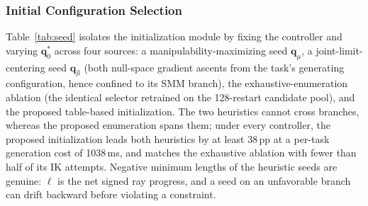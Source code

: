 \documentclass[journal]{IEEEtran}
\newcommand{\phSeedTime}{1038}      %
\newcommand{\phHeurGap}{38}        %
\begin{document}
\subsubsection{Initial Configuration Selection}
Table~\ref{tab:seed} isolates the initialization module by fixing the
controller and varying $\mathbf{q}^{*}_{0}$ across four sources: a
manipulability-maximizing seed $\mathbf{q}_{\mu}$, a
joint-limit-centering seed $\mathbf{q}_{\mathrm{jl}}$ (both null-space
gradient ascents from the task's generating configuration, hence
confined to its SMM branch), the exhaustive-enumeration ablation (the
identical selector retrained on the 128-restart candidate pool), and the
proposed table-based initialization. The two heuristics cannot cross
branches, whereas the proposed enumeration spans them; under every
controller, the proposed initialization leads both heuristics by at
least \phHeurGap\,pp at a per-task generation cost of
\phSeedTime\,ms, and matches the exhaustive ablation with fewer than
half of its IK attempts. Negative minimum lengths of the heuristic
seeds are genuine: $\ell$ is the net signed ray progress, and a seed
on an unfavorable branch can drift backward before violating a
constraint.
\end{document}
